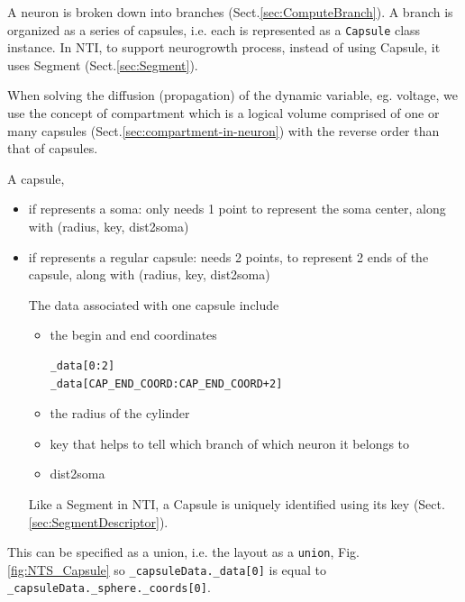 A neuron is broken down into branches (Sect.\ref{sec:ComputeBranch}).  A branch
is organized as a series of capsules, i.e. each is represented as a
\verb!Capsule! class instance.
In NTI, to support neurogrowth process, instead of using Capsule, it uses
Segment (Sect.\ref{sec:Segment}).

\begin{mdframed}

When solving the diffusion (propagation) of the dynamic variable, eg. voltage,
we use the concept of compartment which is a logical volume comprised of one or
many capsules (Sect.\ref{sec:compartment-in-neuron}) with the reverse order than
that of capsules.

\end{mdframed}

A capsule, 
\begin{itemize}
  \item if represents a soma: only needs 1 point to represent the soma center,
  along with (radius, key, dist2soma)
  
  \item if represents a regular capsule: needs 2 points, to represent 2 ends of
  the capsule, along with (radius, key, dist2soma)

The data associated with one capsule include
\begin{itemize}
  \item the begin and end coordinates
\begin{verbatim}
_data[0:2]
_data[CAP_END_COORD:CAP_END_COORD+2]
\end{verbatim}

  \item the radius of the cylinder
  \item key that helps to tell which branch of which neuron it belongs to
  \item dist2soma
\end{itemize}
Like a Segment in NTI, a Capsule is uniquely identified using
its key (Sect.\ref{sec:SegmentDescriptor}).
  
\end{itemize}
This can be specified as a union,  i.e. the layout as a \verb!union!,
Fig.\ref{fig:NTS_Capsule} 
% 
so \verb!_capsuleData._data[0]! is equal to
\verb!_capsuleData._sphere._coords[0]!.

